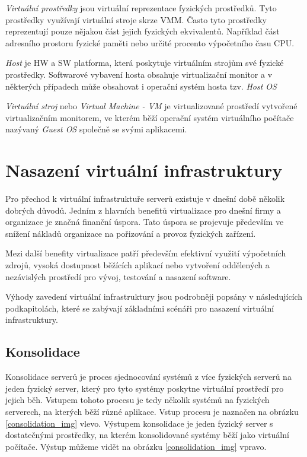   \textit{Virtuální prostředky} jsou virtuální reprezentace fyzických prostředků. Tyto prostředky využívají virtuální stroje skrze VMM. Často tyto prostředky reprezentují pouze nějakou část jejich
  fyzických ekvivalentů. Například část adresního prostoru fyzické paměti nebo určité procento výpočetního času CPU.

  \textit{Host} je HW a SW platforma, která poskytuje virtuálním strojům své fyzické prostředky. Softwarové vybavení hosta obsahuje virtualizační
  monitor a v některých případech může obsahovat i operační systém hosta tzv. \textit{Host OS}

  \textit{Virtuální stroj} nebo \textit{Virtual Machine - VM} je virtualizované prostředí vytvořené virtualizačním monitorem, ve kterém běží operační systém virtuálního počítače nazývaný \textit{Guest OS} společně
  se svými aplikacemi.


\section{Nasazení virtuální infrastruktury}
\label{section:vm_deployment}

Pro přechod k virtuální infrastruktuře serverů existuje v dnešní době několik dobrých důvodů. Jedním z hlavních benefitů virtualizace pro dnešní firmy a organizace je značná finanční úspora. Tato úspora se
projevuje především ve snížení nákladů organizace na pořizování a provoz fyzických zařízení. 

Mezi další benefity virtualizace patří především efektivní využití výpočetních zdrojů, vysoká dostupnost běžících aplikací nebo vytvoření oddělených a nezávislých prostředí pro vývoj, testování a nasazení software.

Výhody zavedení virtuální infrastruktury jsou podrobněji popsány v následujících podkapitolách, které se zabývají základními scénáři pro nasazení virtuální infrastruktury.

\subsection{Konsolidace}
\label{consolidation}

Konsolidace serverů je proces sjednocování systémů z více fyzických serverů na jeden fyzický server, který pro tyto systémy poskytne virtuální prostředí pro jejich běh. Vstupem tohoto procesu je tedy několik systémů na fyzických serverech,
na kterých běží různé aplikace. Vstup procesu je naznačen na obrázku \ref{consolidation_img} vlevo. Výstupem konsolidace je jeden fyzický server s dostatečnými prostředky, na kterém konsolidované systémy běží jako virtuální počítače.
Výstup můžeme vidět na obrázku \ref{consolidation_img} vpravo.

